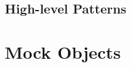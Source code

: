 \documentclass{article}
\begin{document}
\newpage





\subsection{High-level Patterns}



\newpage

\newpage

\newpage

\newpage

\newpage


\newpage


\section{Mock Objects}



\newpage





\end{document}
